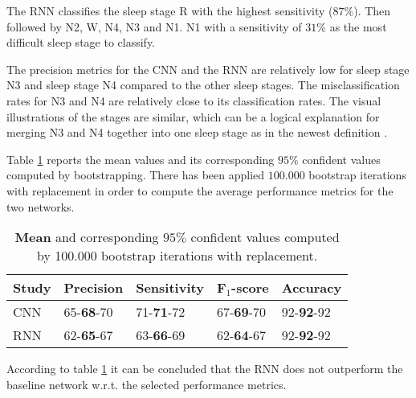 The RNN classifies the sleep stage R with the highest sensitivity ($87\%$). Then followed by N2, W, N4, N3 and N1. N1 with a sensitivity of $31\%$ as the most difficult sleep stage to classify.

The precision metrics for the CNN and the RNN are relatively low for sleep stage N3 and sleep stage N4 compared to the other sleep stages. The misclassification rates for N3 and N4 are relatively close to its classification rates. 
The visual illustrations of the stages are similar, which can be a logical explanation for merging N3 and N4 together into one sleep stage as in the newest definition \cite{AASM}.



Table \ref{tab_res_2} reports the mean values and its corresponding $95\%$ confident values computed by bootstrapping. There has been applied $100.000$ bootstrap iterations with replacement in order to compute the average performance metrics for the two networks.
\begin{table}[th!]
\centering
\begin{tabular}{l | llll}
Study & Precision & Sensitivity & F$_1$-score & Accuracy \\\hline
CNN               & 65-\textbf{68}-70 & 71-\textbf{71}-72 & 67-\textbf{69}-70 & 92-\textbf{92}-92\\
RNN               & 62-\textbf{65}-67 & 63-\textbf{66}-69 & 62-\textbf{64}-67 & 92-\textbf{92}-92
\end{tabular}
\caption{\textbf{Mean} and corresponding $95\%$ confident values computed by 100.000 bootstrap iterations with replacement.}
\label{tab_res_2}
\end{table}
According to table \ref{tab_res_2} it can be concluded that the RNN does not outperform the baseline network w.r.t. the selected performance metrics.

